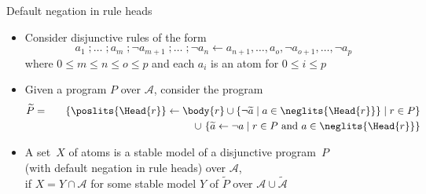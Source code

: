 \begin{frame}{Default negation in rule heads}
  \begin{itemize}
    \item<1-> Consider disjunctive rules of the form
          \[
            a_1\;;\dots\;;a_m\;;{\neg a_{m+1}}\;;\dots\;;{\neg a_n}
            \leftarrow
            a_{n+1},\dots,a_o,{\neg a_{o+1}},\dots,{\neg a_p}
          \]
          where $0\leq m\leq n\leq o\leq p$ and each $a_i$ is an atom for $0\leq i\leq p$

    \item<2-> Given a program $P$ over $\mathcal{A}$, consider the program
          \begin{eqnarray*}
            \widetilde{P}
            &=&\phantom{\cup\ }
            \{\poslits{\Head{r}}\leftarrow \body{r}\cup\{{\neg \widetilde{a}}\mid a\in\neglits{\Head{r}}\}\mid r\in P\}
            \\
            &&\cup\
            \{\widetilde{a}\leftarrow{\neg a}\mid r\in P \text{ and } a\in\neglits{\Head{r}}\}
          \end{eqnarray*}
    \item<3->
          A set~$X$ of atoms is a \alert{stable model} of a disjunctive program~$P$\\
          (with default negation in rule heads) over $\mathcal{A}$,
          \\
          if $X=Y\cap\mathcal{A}$ for some stable model $Y$ of $\widetilde{P}$ over $\mathcal{A}\cup\widetilde{\mathcal{A}}$
  \end{itemize}
\end{frame}
